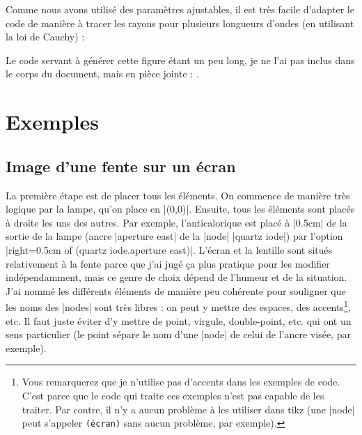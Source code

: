\documentclass[a4paper]{ltxdoc}
\begin{document}
Comme nous avons utilisé des paramètres ajustables, il est très facile d'adapter le code de manière à tracer les rayons pour plusieurs longueurs d'ondes (en utilisant la loi de Cauchy) :

\begin{example only}
\begin{center}

\end{center}
\end{example only}
%
Le code servant à générer cette figure étant un peu long, je ne l'ai pas inclus dans le corps du document, mais en pièce jointe : .


\section{Exemples}

\subsection{Image d'une fente sur un écran}

La première étape est de placer tous les éléments. On commence de manière très logique par la lampe, qu'on place en |(0,0)|. Ensuite, tous les éléments sont placés à droite les uns des autres. Par exemple, l'anticalorique est placé à |0.5cm| de la sortie de la lampe (ancre |aperture east| de la |node| |quartz iode|) par l'option |right=0.5cm of (quartz iode.aperture east)|. L'écran et la lentille sont situés relativement à la fente parce que j'ai jugé ça plus pratique pour les modifier indépendamment, mais ce genre de choix dépend de l'humeur et de la situation. J'ai nommé les différents éléments de manière peu cohérente pour souligner que les noms des |nodes| sont très libres : on peut y mettre des espaces, des accents\footnote{Vous remarquerez que je n'utilise pas d'accents dans les exemples de code. C'est parce que le code qui traite ces exemples n'est pas capable de les traiter. Par contre, il n'y a aucun problème à les utiliser dans tikz (une |node| peut s'appeler \texttt{(écran)} sans aucun problème, par exemple).}, etc. Il faut juste éviter d'y mettre de point, virgule, double-point, etc. qui ont un sens particulier (le point sépare le nom d'une |node| de celui de l'ancre visée, par exemple).

\begin{codeexample}[width=5cm]
\end{codeexample}
\end{document}
